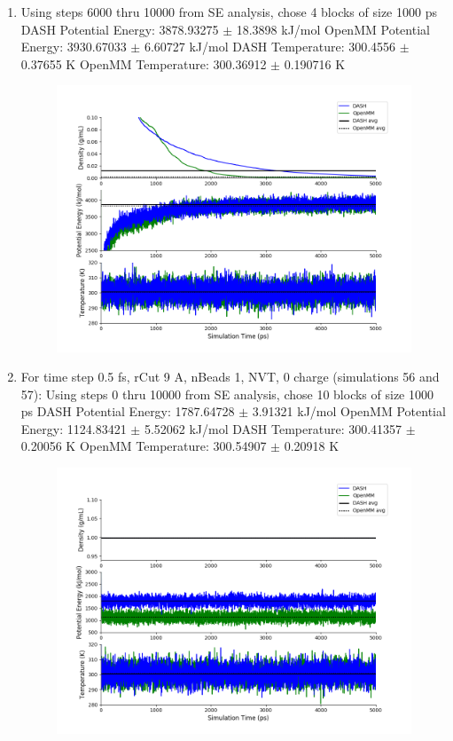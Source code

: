 \documentclass[12pt,reqno]{amsart}
\numberwithin{equation}{section}
\begin{document}
\begin{enumerate}
\item Using steps 6000 thru 10000 from SE analysis, chose 4 blocks of size 1000 ps 
\subitem DASH Potential Energy: 3878.93275 $\pm$ 18.3898 kJ/mol
\subitem OpenMM Potential Energy: 3930.67033 $\pm$ 6.60727 kJ/mol
\subitem DASH Temperature: 300.4556 $\pm$ 0.37655  K
\subitem OpenMM Temperature:  300.36912 $\pm$ 0.190716 K
\begin{figure}[H]
\centering
\includegraphics[scale=0.7]{MC-MM-0charge-narrow}
\end{figure} 

\item For time step 0.5 fs, rCut 9 A, nBeads 1, NVT, 0 charge (simulations 56 and 57):
Using steps 0 thru 10000 from SE analysis, chose 10 blocks of size 1000 ps 
\subitem DASH Potential Energy: 1787.64728 $\pm$ 3.91321 kJ/mol
\subitem OpenMM Potential Energy: 1124.83421 $\pm$ 5.52062 kJ/mol
\subitem DASH Temperature: 300.41357 $\pm$ 0.20056  K
\subitem OpenMM Temperature:  300.54907 $\pm$ 0.20918 K
\begin{figure}[H]
\centering
\includegraphics[scale=0.7]{MC-MM-0charge-NVT}
\end{figure} 
\end{enumerate}
\end{document}
